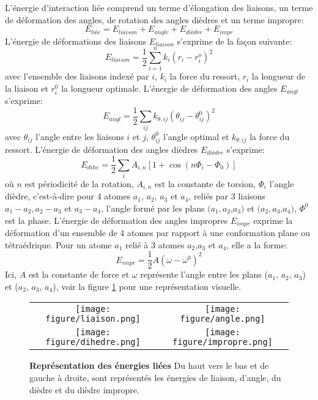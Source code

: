L'énergie d'interaction liée comprend un terme d'élongation des liaisons, un terme de déformation des angles, de rotation des angles dièdres et un terme \og impropre\fg:
\begin{equation}
  E_{liée} = E_{liaison} + E_{angle} +E_{dièdre} + E_{impr}
\end{equation}
L'énergie de déformations des liaisons $E_{liaison}$ s'exprime de la façon suivante:
\begin{equation}
  E_{liaison} = \frac{1}{2} \sum_{i=1}^{n} k_{i} (r_i - r^o_i)^2
\end{equation}
avec l'ensemble des liaisons indexé par $i$, $k_{i}$ la force du ressort, $r_{i}$ la longueur de la liaison et $r^0_i$ la longueur optimale. L'énergie de déformation des angles $E_{angl}$ s'exprime:
\begin{equation}
  E_{angl} =\frac{1}{2} \sum_{ij}k_{\theta,ij}(\theta_{ij} - \theta_{ij}^0)^2
\end{equation}
avec $\theta_{ij}$ l'angle entre les liaisons $i$ et $j$, $\theta_{ij}^0$ l'angle optimal et $k_{\theta,ij}$ la force du ressort.
L'énergie de déformation des angles dièdres $E_{dièdre}$ s'exprime:
\begin{equation}
E_{dihe} = \frac{1}{2}\sum_{i} A_{i,n}[ 1 + \cos(n\Phi_i - \Phi_0)]
\end{equation}
où $n$ est périodicité de la rotation, $A_{i,n}$ est la constante de torsion, $\Phi_i$ l'angle dièdre, c'est-à-dire pour 4 atomes $a_1$, $a_2$, $a_3$ et $a_4$, reliés par 3 liaisons $a_1-a_2, a_2-a_3$ et $ a_3-a_4$, l'angle formé par les plans $(a_1,a_2$,$a_3)$ et $(a_2,a_3$,$a_4)$, $\Phi^0$ est la phase. L'énergie de déformation des angles impropres $E_{impr}$ exprime la déformation d'un  ensemble  de 4 atomes  par rapport à une conformation plane ou tétraédrique. Pour un atome $a_1$ relié à 3 atomes $a_2$,$a_3$ et $a_4$, elle a la forme:
\begin{equation}
  E_{impr}= \frac{1}{2}A(\omega - \omega^0)^2
\end{equation}
Ici, $A$ est la constante de force et $\omega$ représente l'angle entre les plans ($a_1$, $a_2$, $a_3$) et ($a_2$, $a_3$, $a_4$), voir la figure \ref{graph:Eliees} pour une représentation visuelle.

   \begin{figure}[!htbp]
     \centering
     \begin{tabular}{cc}
       \texttt{[image: figure/liaison.png]} &
       \texttt{[image: figure/angle.png]} \\
       \texttt{[image: figure/dihedre.png]} &
       \texttt{[image: figure/impropre.png]} \\

     \end{tabular}
     
     \caption{\textbf{Représentation des énergies liées} Du haut vers le bas et de gauche à droite, sont représentés les énergies de liaison, d'angle, du dièdre et du dièdre impropre.}
\label{graph:Eliees}
   \end{figure}

